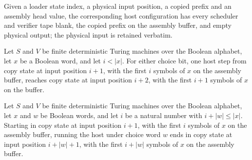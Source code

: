 \begin{definition}
\label{Complexity.b2LoadCfg}
\leanok
{}
Given a loader state index, a physical input position, a copied prefix and an assembly head value, the corresponding host configuration has every scheduler and verifier tape blank, the copied prefix on the assembly buffer, and empty physical output; the physical input is retained verbatim.
\end{definition}

\begin{lemma}
\label{Complexity.b2_copy_step}
\leanok
{}
Let $S$ and $V$ be finite deterministic Turing machines over the Boolean alphabet, let
$x$ be a Boolean word, and let $i<|x|$. For either choice bit, one host step from copy
state at input position $i+1$, with the first $i$ symbols of $x$ on the assembly buffer,
reaches copy state at input position $i+2$, with the first $i+1$ symbols of $x$ on the
buffer.
\end{lemma}

\begin{lemma}
\label{Complexity.b2_copy_run}
\leanok
{}
Let $S$ and $V$ be finite deterministic Turing machines over the Boolean alphabet, let
$x$ and $w$ be Boolean words, and let $i$ be a natural number with $i+|w|\le |x|$.
Starting in copy state at input position $i+1$, with the first $i$ symbols of $x$ on the
assembly buffer, running the host under choice word $w$ ends in copy state at input
position $i+|w|+1$, with the first $i+|w|$ symbols of $x$ on the assembly buffer.
\end{lemma}

